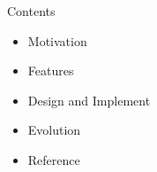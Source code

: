 \begin{frame}
  \titlepage
\end{frame}

\begin{frame}{Contents}
    \begin{itemize}
    \item \alert{Motivation}
    \item \alert{Features}
    \item \alert{Design and Implement}
    \item \alert{Evolution}
    \item \alert{Reference}    
    \end{itemize}
\end{frame}
